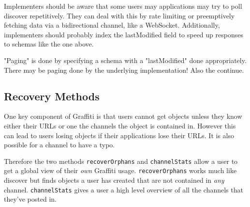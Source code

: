 Implementers should be aware that some users may applications may try to poll discover repetitively. They can deal with this by rate limiting or preemptively fetching data via a bidirectional channel, like a WebSocket. Additionally, implementers should probably index the lastModified field to speed up responses to schemas like the one above.

"Paging" is done by specifying a schema with a "lastModified" done appropriately.
There may be paging done by the underlying implementation!
Also the continue.

\subsection{Recovery Methods}

One key component of Graffiti is that users cannot get objects
unless they know either their URLs or one the channels the object
is contained in.
However this can lead to users losing objects if their applications
lose their URLs. It is also possible for a channel to have a typo.

Therefore the two methods \texttt{recoverOrphans} and \texttt{channelStats}
allow a user to get a global view of their \emph{own} Graffiti usage.
\texttt{recoverOrphans} works much like discover but finds objects
a user has created that are not contained in \emph{any} channel.
\texttt{channelStats} gives a user a high level overview of all the
channels that they've posted in.
